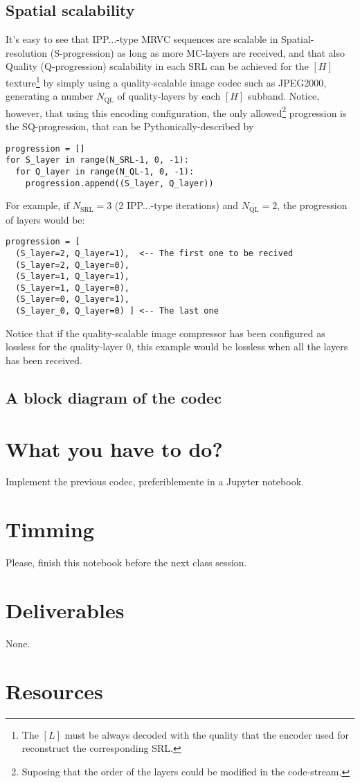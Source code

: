\subsection{Spatial scalability}
It's easy to see that IPP...-type MRVC sequences are scalable in
Spatial-resolution (S-progression) as long as more MC-layers are
received, and that also Quality (Q-progression) scalability in each
SRL can be achieved for the $[H]$ texture\footnote{The $[L]$ must be
always decoded with the quality that the encoder used for reconstruct
the corresponding SRL.} by simply using a quality-scalable image codec
such as JPEG2000, generating a number $N_{\text{QL}}$ of quality-layers
by each $[H]$ subband. Notice, however, that using this encoding
configuration, the only allowed\footnote{Suposing that the order of
the layers could be modified in the code-stream.} progression is the
SQ-progression, that can be Pythonically-described by
\begin{verbatim}
progression = []
for S_layer in range(N_SRL-1, 0, -1):
  for Q_layer in range(N_QL-1, 0, -1):
    progression.append((S_layer, Q_layer))
\end{verbatim}

For example, if $N_{\text{SRL}}=3$ (2 IPP...-type iterations)
and $N_{\text{QL}}=2$, the progression of layers would be:
\begin{verbatim}
progression = [
  (S_layer=2, Q_layer=1),  <-- The first one to be recived
  (S_layer=2, Q_layer=0),
  (S_layer=1, Q_layer=1),
  (S_layer=1, Q_layer=0),
  (S_layer=0, Q_layer=1),
  (S_layer_0, Q_layer=0) ] <-- The last one
\end{verbatim}
Notice that if the quality-scalable image compressor has been
configured as lossless for the quality-layer 0, this example
would be lossless when all the layers has been received.

\subsection{A block diagram of the codec}

\section{What you have to do?}

Implement the previous codec, preferiblemente in a Jupyter notebook. 

\section{Timming}

Please, finish this notebook before the next class session.

\section{Deliverables}

None.

\section{Resources}


